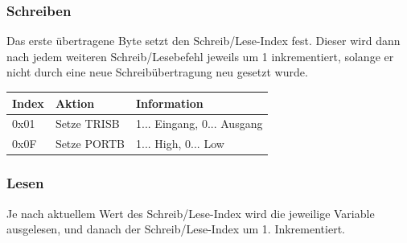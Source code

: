 \documentclass[a4paper,10pt]{article}
\begin{document}
\subsubsection{Schreiben}

Das erste übertragene Byte setzt den Schreib/Lese-Index fest. Dieser wird dann nach jedem weiteren Schreib/Lesebefehl jeweils um 1 inkrementiert, solange er nicht durch eine neue Schreibübertragung neu gesetzt wurde.

\begin{center}
    \begin{tabular}{| l | l | l |}
    \hline
    \textbf{Index} 	& \textbf{Aktion} 	& \textbf{Information} \\ \hline
    0x01 		& Setze TRISB 		& 1... Eingang, 0... Ausgang \\ \hline
    0x0F 		& Setze PORTB 		& 1... High, 0... Low \\ \hline
    \end{tabular}
\end{center}

\subsubsection{Lesen}

Je nach aktuellem Wert des Schreib/Lese-Index wird die jeweilige Variable ausgelesen, und danach der Schreib/Lese-Index um 1. Inkrementiert.
\end{document}
